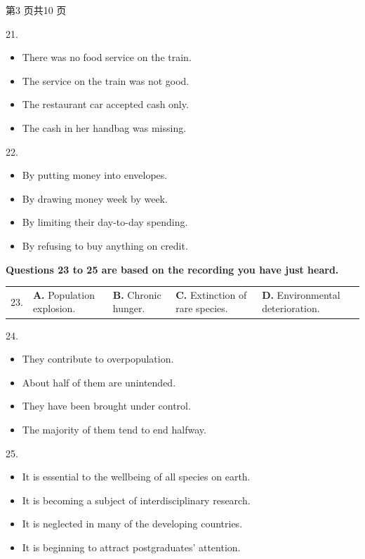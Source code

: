 \documentclass[UTF8,11pt]{ctexart}
\begin{document}
第3 页共10 页


21.


\begin{itemize}[leftmargin=2em,itemsep=.2em,topsep=.4em]\item[A.] There was no food service on the train.
\item[B.] The service on the train was not good.
\item[C.] The restaurant car accepted cash only.
\item[D.] The cash in her handbag was missing.
\end{itemize}

22.


\begin{itemize}[leftmargin=2em,itemsep=.2em,topsep=.4em]\item[A.] By putting money into envelopes.
\item[B.] By drawing money week by week.
\item[C.] By limiting their day-to-day spending.
\item[D.] By refusing to buy anything on credit.
\end{itemize}

\textbf{Questions 23 to 25 are based on the recording you have just heard.}


\noindent\begin{tabularx}{\linewidth}{@{}lXXXX@{}}23. & \textbf{A.} Population explosion. & \textbf{B.} Chronic hunger. & \textbf{C.} Extinction of rare species. & \textbf{D.} Environmental deterioration.\\\end{tabularx}\par

24.


\begin{itemize}[leftmargin=2em,itemsep=.2em,topsep=.4em]\item[A.] They contribute to overpopulation.
\item[B.] About half of them are unintended.
\item[C.] They have been brought under control.
\item[D.] The majority of them tend to end halfway.
\end{itemize}

25.


\begin{itemize}[leftmargin=2em,itemsep=.2em,topsep=.4em]\item[A.] It is essential to the wellbeing of all species on earth.
\item[B.] It is becoming a subject of interdisciplinary research.
\item[C.] It is neglected in many of the developing countries.
\item[D.] It is beginning to attract postgraduates’ attention.
\end{itemize}
\end{document}
